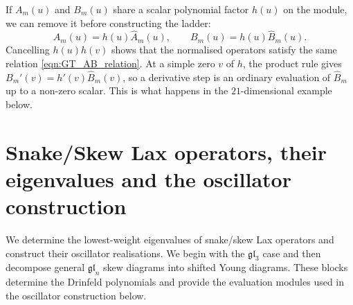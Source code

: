 \documentclass[12pt,reqno]{amsart}
\numberwithin{equation}{section}
\begin{document}
If $A_m(u)$ and $B_m(u)$ share a scalar polynomial factor $h(u)$
on the module, we can remove it before constructing the ladder:
\begin{equation*}
	A_m(u)=h(u)\widehat A_m(u),
	\qquad B_m(u)=h(u)\widehat B_m(u).
\end{equation*}
Cancelling $h(u)h(v)$ shows that the normalised operators satisfy
the same relation \eqref{eqn:GT_AB_relation}. At a simple zero
$v$ of $h$, the product rule gives
$B_m'(v)=h'(v)\widehat B_m(v)$, so a derivative step is an
ordinary evaluation of $\widehat B_m$ up to a non-zero scalar.
This is what happens in the $21$-dimensional example below.
    
\section{Snake/Skew Lax operators, their eigenvalues and the oscillator construction}
	\label{sect:snake/skew_lax}
	
	We determine the lowest-weight eigenvalues of snake/skew Lax operators
	and construct their oscillator realisations. We begin with the
	$\mathfrak{gl}_3$ case and then decompose general $\mathfrak{gl}_n$
	skew diagrams into shifted Young diagrams. These blocks determine
	the Drinfeld polynomials and provide the evaluation modules used
	in the oscillator construction below.
	
\end{document}
